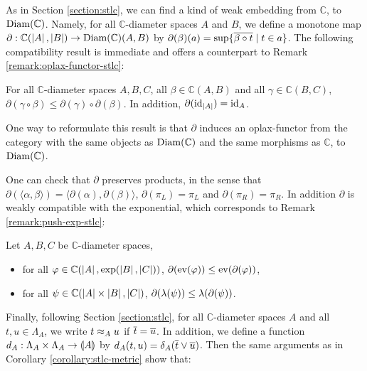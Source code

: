 As in Section \ref{section:stlc}, we can find a kind of weak embedding from $\mathbb{C}$, to $\operatorname{Diam}(\mathbb{C})$. Namely, for all $\mathbb{C}$-diameter spaces $A$ and $B$, we define a monotone map $\partial : \mathbb{C}(\left\vert A\right\vert, \left\vert B\right\vert) \to \operatorname{Diam}\allowbreak(\mathbb{C})(A, B)$ by $\partial(\beta)(a) = \sup \{ \overline{\beta \circ t} \mid t \in a \}$. The following compatibility result is immediate and offers a counterpart to Remark \ref{remark:oplax-functor-stlc}:

\begin{proposition} For all $\mathbb{C}$-diameter spaces $A, B, C$, all $\beta \in \mathbb{C}(A, B)$ and all $\gamma \in \mathbb{C}(B, C)$, $\partial(\gamma \circ \beta) \leq \partial(\gamma) \circ \partial(\beta)$. In addition, $\partial(\operatorname{id}_{\left\vert A\right\vert}) = \operatorname{id}_A$.
\end{proposition}
 
One way to reformulate this result is that $\partial$ induces an oplax-functor from the category with the same objects as $\operatorname{Diam}(\mathbb{C})$ and the same morphisms as $\mathbb{C}$, to $\operatorname{Diam}(\mathbb{C})$.

One can check that $\partial$ preserves products, in the sense that $\partial (\langle \alpha, \beta \rangle) = \langle\partial(\alpha), \partial(\beta)\rangle$, $\partial(\pi_L) = \pi_L$ and $\partial(\pi_R) = \pi_R$. In addition $\partial$ is weakly compatible with the exponential, which corresponds to Remark \ref{remark:push-exp-stlc}:

\begin{proposition} Let $A, B, C$ be $\mathbb{C}$-diameter spaces, \begin{itemize}
\item for all $\varphi \in \mathbb{C}(\left\vert A\right\vert, \exp(\left\vert B\right\vert, \left\vert C\right\vert))$, $\partial(\operatorname{ev}(\varphi)) \leq \operatorname{ev}(\partial(\varphi))$,
\item for all $\psi \in \mathbb{C}(\left\vert A\right\vert\times\left\vert B\right\vert, \left\vert C\right\vert)$, $\partial(\lambda(\psi)) \leq \lambda(\partial(\psi))$.
\end{itemize}
\end{proposition}

Finally, following Section \ref{section:stlc}, for all $\mathbb{C}$-diameter spaces $A$ and all  $t,u \in \Lambda_A$, we write $t \approx_A u$ if $\overline{t} = \overline{u}$. In addition, we define a function $d_A : \Lambda_A \times \Lambda_A \to \llparenthesis A \rrparenthesis$ by $d_A(t,u) = \delta_A(\overline{t} \vee \overline{u})$. Then the same arguments as in Corollary \ref{corollary:stlc-metric} show that:

